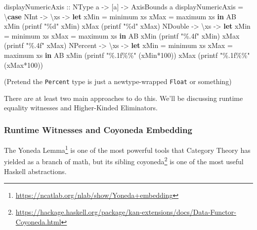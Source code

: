 \documentclass[]{article}
\newenvironment{Shaded}{}{}
\newcommand{\DataTypeTok}[1]{\textcolor[rgb]{0.56,0.13,0.00}{#1}}
\newcommand{\DecValTok}[1]{\textcolor[rgb]{0.25,0.63,0.44}{#1}}
\newcommand{\FunctionTok}[1]{\textcolor[rgb]{0.02,0.16,0.49}{#1}}
\newcommand{\KeywordTok}[1]{\textcolor[rgb]{0.00,0.44,0.13}{\textbf{#1}}}
\newcommand{\NormalTok}[1]{#1}
\newcommand{\OperatorTok}[1]{\textcolor[rgb]{0.40,0.40,0.40}{#1}}
\newcommand{\OtherTok}[1]{\textcolor[rgb]{0.00,0.44,0.13}{#1}}
\newcommand{\StringTok}[1]{\textcolor[rgb]{0.25,0.44,0.63}{#1}}
\renewcommand{\href}[2]{#2\footnote{\url{#1}}}
\begin{document}
\begin{Shaded}
\begin{Highlighting}[]
\OtherTok{displayNumericAxis ::} \DataTypeTok{NType}\NormalTok{ a }\OtherTok{{-}\textgreater{}}\NormalTok{ [a] }\OtherTok{{-}\textgreater{}} \DataTypeTok{AxisBounds}\NormalTok{ a}
\NormalTok{displayNumericAxis }\OtherTok{=}\NormalTok{ \textbackslash{}}\KeywordTok{case}
    \DataTypeTok{NInt} \OtherTok{{-}\textgreater{}}\NormalTok{ \textbackslash{}xs }\OtherTok{{-}\textgreater{}}
      \KeywordTok{let}\NormalTok{ xMin }\OtherTok{=} \FunctionTok{minimum}\NormalTok{ xs}
\NormalTok{          xMax }\OtherTok{=} \FunctionTok{maximum}\NormalTok{ xs}
       \KeywordTok{in} \DataTypeTok{AB}\NormalTok{ xMin (printf }\StringTok{"\%d"}\NormalTok{ xMin) xMax (printf }\StringTok{"\%d"}\NormalTok{ xMax)}
    \DataTypeTok{NDouble} \OtherTok{{-}\textgreater{}}\NormalTok{ \textbackslash{}xs }\OtherTok{{-}\textgreater{}}
      \KeywordTok{let}\NormalTok{ xMin }\OtherTok{=} \FunctionTok{minimum}\NormalTok{ xs}
\NormalTok{          xMax }\OtherTok{=} \FunctionTok{maximum}\NormalTok{ xs}
       \KeywordTok{in} \DataTypeTok{AB}\NormalTok{ xMin (printf }\StringTok{"\%.4f"}\NormalTok{ xMin) xMax (printf }\StringTok{"\%.4f"}\NormalTok{ xMax)}
    \DataTypeTok{NPercent} \OtherTok{{-}\textgreater{}}\NormalTok{ \textbackslash{}xs }\OtherTok{{-}\textgreater{}}
      \KeywordTok{let}\NormalTok{ xMin }\OtherTok{=} \FunctionTok{minimum}\NormalTok{ xs}
\NormalTok{          xMax }\OtherTok{=} \FunctionTok{maximum}\NormalTok{ xs}
       \KeywordTok{in} \DataTypeTok{AB}\NormalTok{ xMin (printf }\StringTok{"\%.1f\%\%"}\NormalTok{ (xMin}\OperatorTok{*}\DecValTok{100}\NormalTok{)) xMax (printf }\StringTok{"\%.1f\%\%"}\NormalTok{ (xMax}\OperatorTok{*}\DecValTok{100}\NormalTok{))}
\end{Highlighting}
\end{Shaded}

(Pretend the \texttt{Percent} type is just a newtype-wrapped \texttt{Float} or
something)

There are at least two main approaches to do this. We'll be discussing runtime
equality witnesses and Higher-Kinded Eliminators.

\subsubsection{Runtime Witnesses and Coyoneda
Embedding}\label{runtime-witnesses-and-coyoneda-embedding}

The \href{https://ncatlab.org/nlab/show/Yoneda+embedding}{Yoneda Lemma} is one
of the most powerful tools that Category Theory has yielded as a branch of math,
but its sibling
\href{https://hackage.haskell.org/package/kan-extensions/docs/Data-Functor-Coyoneda.html}{coyoneda}
is one of the most useful Haskell abstractions.
\end{document}
